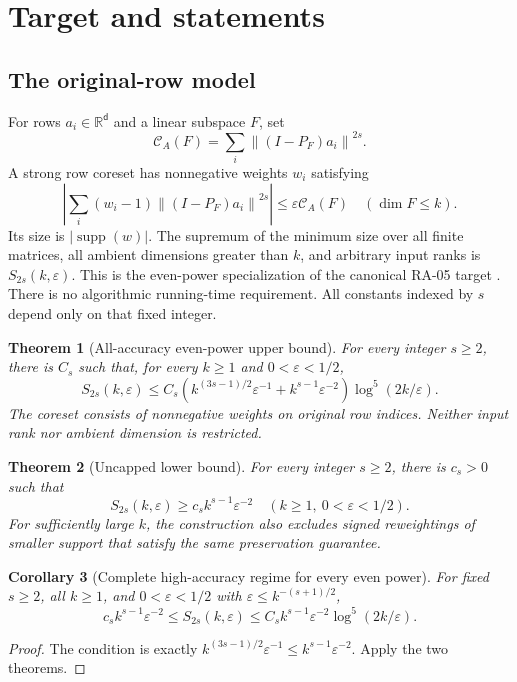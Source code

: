 \documentclass[11pt]{article}
\newtheorem{theorem}{Theorem}[section]
\newtheorem{corollary}[theorem]{Corollary}
\theoremstyle{remark}\newtheorem{remark}[theorem]{Remark}
\newcommand{\R}{\mathbb R}\newcommand{\E}{\mathbb E}\newcommand{\Prob}{\mathbb P}
\newcommand{\eps}{\varepsilon}\newcommand{\Sym}{\operatorname{Sym}}
\newcommand{\supp}{\operatorname{supp}}\newcommand{\op}{\mathrm{op}}\newcommand{\HS}{\mathrm{HS}}
\newcommand{\norm}[1]{\left\|#1\right\|}\newcommand{\ip}[2]{\left\langle #1,#2\right\rangle}
\newcommand{\cost}{\mathcal C}\newcommand{\OPT}{\mathsf{OPT}}
\begin{document}
\section{Target and statements}
\subsection{The original-row model}
For rows $a_i\in\R^{\mathsf d}$ and a linear subspace $F$, set
\[
 \cost_A(F)=\sum_i\norm{(I-P_F)a_i}^{2s}.
\]
A strong row coreset has nonnegative weights $w_i$ satisfying
\begin{equation}\label{eq:strong}
 \left|\sum_i(w_i-1)\norm{(I-P_F)a_i}^{2s}\right|
 \le\eps\cost_A(F)\quad(\dim F\le k).
\end{equation}
Its size is $|\supp(w)|$. The supremum of the minimum size over all finite matrices, all ambient dimensions greater than $k$, and arbitrary input ranks is $S_{2s}(k,\eps)$. This is the even-power specialization of the canonical RA-05 target \cite{ra05}. There is no algorithmic running-time requirement. All constants indexed by $s$ depend only on that fixed integer.

\begin{theorem}[All-accuracy even-power upper bound]\label{thm:upper}
For every integer $s\ge2$, there is $C_s$ such that, for every $k\ge1$ and $0<\eps<1/2$,
\begin{equation}\label{eq:upper}
 S_{2s}(k,\eps)\le C_s\left(k^{(3s-1)/2}\eps^{-1}+k^{s-1}\eps^{-2}\right)
 \log^5(2k/\eps).
\end{equation}
The coreset consists of nonnegative weights on original row indices. Neither input rank nor ambient dimension is restricted.
\end{theorem}

\begin{theorem}[Uncapped lower bound]\label{thm:lower}
For every integer $s\ge2$, there is $c_s>0$ such that
\begin{equation}\label{eq:lower}
 S_{2s}(k,\eps)\ge c_s k^{s-1}\eps^{-2}
 \quad(k\ge1,\ 0<\eps<1/2).
\end{equation}
For sufficiently large $k$, the construction also excludes signed reweightings of smaller support that satisfy the same preservation guarantee.
\end{theorem}

\begin{corollary}[Complete high-accuracy regime for every even power]\label{cor:high}
For fixed $s\ge2$, all $k\ge1$, and $0<\eps<1/2$ with $\eps\le k^{-(s+1)/2}$,
\begin{equation}\label{eq:high}
 c_s k^{s-1}\eps^{-2}\le S_{2s}(k,\eps)
 \le C_s k^{s-1}\eps^{-2}\log^5(2k/\eps).
\end{equation}
\end{corollary}
\begin{proof}
The condition is exactly $k^{(3s-1)/2}\eps^{-1}\le k^{s-1}\eps^{-2}$. Apply the two theorems.
\end{proof}
\end{document}
